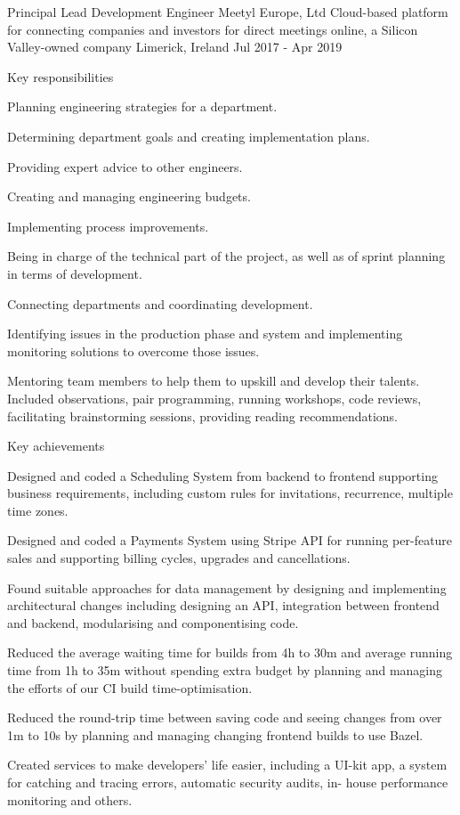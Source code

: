 \begin{cventries}
    \cventry
    {Principal Lead Development Engineer} %
    {Meetyl Europe, Ltd} %
    {Cloud-based platform for connecting companies and investors for direct meetings online, a Silicon Valley-owned company} %
    {Limerick, Ireland} %
    {Jul 2017 - Apr 2019} %
    {
        \begin{cvitems}{Key responsibilities}
            \item {Planning engineering strategies for a department.}
            \item {Determining department goals and creating implementation plans.}
            \item {Providing expert advice to other engineers.}
            \item {Creating and managing engineering budgets.}
            \item {Implementing process improvements.}
            \item {Being in charge of the technical part of the project, as well as of sprint planning in terms of development.}
            \item {Connecting departments and coordinating development.}
            \item {Identifying issues in the production phase and system and implementing monitoring solutions to overcome those issues.}
            \item {Mentoring team members to help them to upskill and develop their talents. Included observations, pair programming, running workshops, code reviews, facilitating brainstorming sessions, providing reading recommendations.}
        \end{cvitems}
        \begin{cvitems}{Key achievements}
            \item {Designed and coded a Scheduling System from backend to frontend supporting business requirements, including custom rules for invitations, recurrence, multiple time zones.}
            \item {Designed and coded a Payments System using Stripe API for running per-feature sales and supporting billing cycles, upgrades and cancellations.}
            \item {Found suitable approaches for data management by designing and implementing architectural changes including designing an API, integration between frontend and backend, modularising and componentising code.}
            \item {Reduced the average waiting time for builds from 4h to 30m and average running time from 1h to 35m without spending extra budget by planning and managing the efforts of our CI build time-optimisation.}
            \item {Reduced the round-trip time between saving code and seeing changes from over 1m to 10s by planning and managing changing frontend builds to use Bazel.}
            \item {Created services to make developers’ life easier, including a UI-kit app, a system for catching and tracing errors, automatic security audits, in- house performance monitoring and others.}
        \end{cvitems}
    }


\end{cventries}
